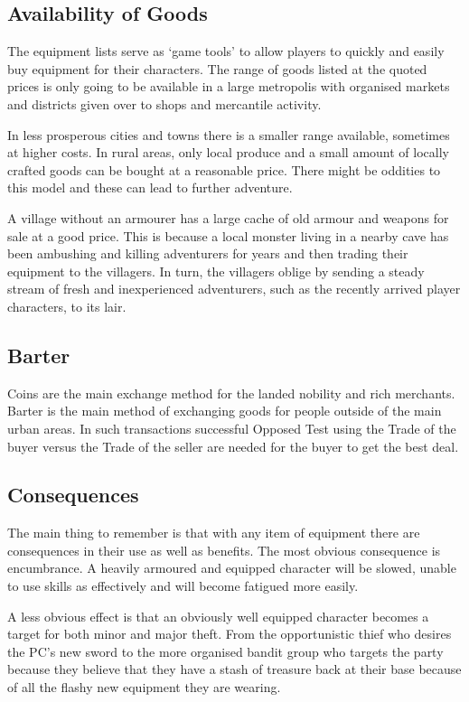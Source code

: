 \subsection{Availability of Goods}
The equipment lists serve as ‘game tools’ to allow players to quickly and easily buy equipment for their characters. The range of goods listed at the quoted prices is only going to be available in a large metropolis with organised markets and districts given over to shops and mercantile activity. 

In less prosperous cities and towns there is a smaller range available, sometimes at higher costs. In rural areas, only local produce and a small amount of locally crafted goods can be bought at a reasonable price. There might be oddities to this model and these can lead to further adventure. 

\begin{rpg-examplebox}
A village without an armourer has a large cache of old armour and weapons for sale at a good price. This is because a local monster living in a nearby cave has been ambushing and killing adventurers for years and then trading their equipment to the villagers. In turn, the villagers oblige by sending a steady stream of fresh and inexperienced adventurers, such as the recently arrived player characters, to its lair.
\end{rpg-examplebox}

\subsection{Barter}
Coins are the main exchange method for the landed nobility and rich merchants. Barter is the main method of exchanging goods for people outside of the main urban areas. In such transactions successful Opposed Test using the Trade of the buyer versus the Trade of the seller are needed for the buyer to get the best deal.


\subsection{Consequences}
The main thing to remember is that with any item of equipment there are consequences in their use as well as benefits. The most obvious consequence is encumbrance. A heavily armoured and equipped character will be slowed, unable to use skills as effectively and will become fatigued more easily.

A less obvious effect is that an obviously well equipped character becomes a target for both minor and major theft. From the opportunistic thief who desires the PC’s new sword to the more organised bandit group who targets the party because they believe that they have a stash of treasure back at their base because of all the flashy new equipment they are wearing.

